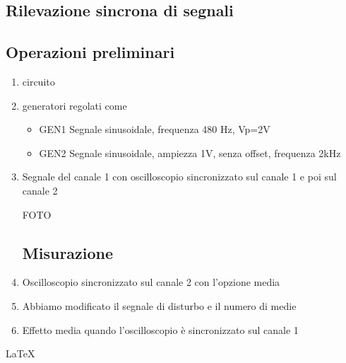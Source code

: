 \documentclass[a4paper]{article}
\begin{document}
\begin{tcolorbox}[breakable,colback=cyan,colframe=cyan]
\section*{Rilevazione sincrona di segnali}
\end{tcolorbox}


\subsection{Operazioni preliminari}
 \begin{enumerate}
  \item circuito
  \item generatori regolati come
   \begin{itemize}
     \item GEN1 Segnale sinusoidale, frequenza 480 Hz, Vp=2V
     \item GEN2 Segnale sinusoidale, ampiezza 1V, senza offset, frequenza 2kHz
   \end{itemize}
  \item Segnale del canale 1 con oscilloscopio sincronizzato sul canale 1 e poi sul canale 2

FOTO

\subsection{Misurazione}
  \item Oscilloscopio sincronizzato sul canale 2 con l'opzione media
  \item Abbiamo modificato il segnale di disturbo e il numero di medie
  \item Effetto media quando l'oscilloscopio è sincronizzato sul canale 1
 \end{enumerate}

\noindent \LaTeX
\end{document}
